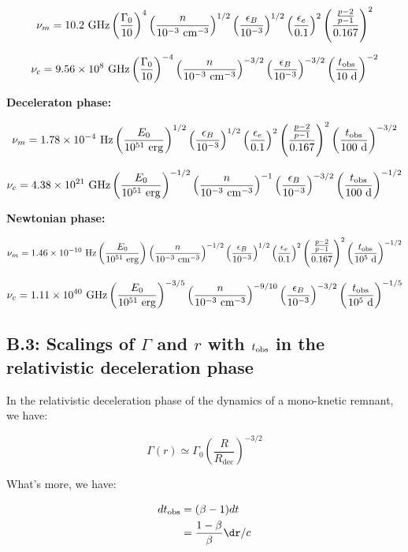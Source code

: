$$\nu_m = 10.2~\rm{GHz} \left(\frac{\Gamma_0}{10} \right)^{4} \left(\frac{n}{10^{-3}~\rm{cm}^{-3}} \right)^{1/2} \left(\frac{\epsilon_B}{10^{-3}} \right)^{1/2} \left(\frac{\epsilon_e}{0.1} \right)^{2} \left(\frac{\frac{p - 2}{p - 1}}{0.167} \right)^{2}$$


$$\nu_c = 9.56 \times 10^8~\rm{GHz} \left(\frac{\Gamma_0}{10} \right)^{-4} \left(\frac{n}{10^{-3}~\rm{cm}^{-3}} \right)^{-3/2} \left(\frac{\epsilon_B}{10^{-3}} \right)^{-3/2}  \left(\frac{t_{\rm{obs}}}{10~\rm{d}} \right)^{-2}$$


\bf{Deceleraton phase:}

$$\nu_m = 1.78 \times 10^{-4}~\rm{Hz} \left(\frac{E_0}{10^{51}~\rm{erg}} \right)^{1/2}  \left(\frac{\epsilon_B}{10^{-3}} \right)^{1/2} \left(\frac{\epsilon_e}{0.1} \right)^{2} \left(\frac{\frac{p - 2}{p - 1}}{0.167} \right)^{2} \left(\frac{t_{\rm{obs}}}{100~\rm{d}} \right)^{-3/2} $$


$$\nu_c = 4.38 \times 10^{21}~\rm{GHz} \left(\frac{E_0}{10^{51}~\rm{erg}} \right)^{-1/2} \left(\frac{n}{10^{-3}~\rm{cm}^{-3}} \right)^{-1} \left(\frac{\epsilon_B}{10^{-3}} \right)^{-3/2} \left(\frac{t_{\rm{obs}}}{100~\rm{d}} \right)^{-1/2}$$


\bf{Newtonian phase:}

$$\nu_m = 1.46 \times 10^{-10}~\rm{Hz} \left(\frac{E_0}{10^{51}~\rm{erg}} \right)^{} \left(\frac{n}{10^{-3}~\rm{cm}^{-3}} \right)^{-1/2} \left(\frac{\epsilon_B}{10^{-3}} \right)^{1/2} \left(\frac{\epsilon_e}{0.1} \right)^{2} \left(\frac{\frac{p - 2}{p - 1}}{0.167} \right)^{2} \left(\frac{t_{\rm{obs}}}{10^5~\rm{d}} \right)^{-1/2} $$

$$\nu_c = 1.11 \times 10^{40}~\rm{GHz} \left(\frac{E_0}{10^{51}~\rm{erg}} \right)^{-3/5} \left(\frac{n}{10^{-3}~\rm{cm}^{-3}} \right)^{-9/10} \left(\frac{\epsilon_B}{10^{-3}} \right)^{-3/2} \left(\frac{t_{\rm{obs}}}{10^5~\rm{d}} \right)^{-1/5} $$

\subsection*{B.3: Scalings of $\Gamma$ and $r$ with $\tobs$ in the relativistic deceleration phase}

In the relativistic deceleration phase of the dynamics of a mono-knetic remnant, we have:

$$\Gamma(r) \simeq \Gamma_0 \left( \frac{R}{R_{\text{dec}}} \right)^{-3/2}$$

What's more, we have:

\begin{align}
    d\tobs &= (\beta - 1) dt \\
           &= \frac{1 - \beta}{\beta} \dr/c
\end{align}

